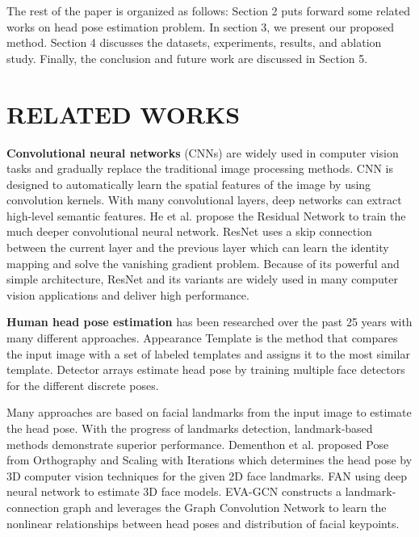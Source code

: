 \documentclass[a4paper,twoside]{article}
\begin{document}
The rest of the paper is organized as follows: Section 2 puts forward some related works on head pose estimation problem. In section 3, we present our proposed method. Section 4 discusses the datasets, experiments, results, and ablation study. Finally, the conclusion and future work are discussed in Section 5.

\section{\uppercase{Related Works}}
\textbf{Convolutional neural networks} (CNNs) are widely used in computer vision tasks and gradually replace the traditional image processing methods. CNN is designed to automatically learn the spatial features of the image by using convolution kernels. With many convolutional layers, deep networks can extract high-level semantic features. He et al. \cite{he2016deep} propose the Residual Network to train the much deeper convolutional neural network. ResNet uses a skip connection between the current layer and the previous layer which can learn the identity mapping and solve the vanishing gradient problem. Because of its powerful and simple architecture, ResNet and its variants \cite{xie2017aggregated,zhang2020resnest,gao2019res2net} are widely used in many computer vision applications and deliver high performance.

\textbf{Human head pose estimation} has been researched over the past 25 years with many different approaches. Appearance Template \cite{niyogi1996example,beymer1994face,sherrah2001face,ng2002composite,sherrah1999understanding} is the method that compares the input image with a set of labeled templates and assigns it to the most similar template. Detector arrays \cite{huang1998face,zhang2006head,jones2003fast} estimate head pose by training multiple face detectors for the different discrete poses. 

Many approaches are based on facial landmarks from the input image to estimate the head pose. With the progress of landmarks detection, landmark-based methods demonstrate superior performance. Dementhon et al. \cite{dementhon1995model} proposed Pose from Orthography and Scaling with Iterations which determines the head pose by 3D computer vision techniques for the given 2D face landmarks. FAN \cite{bulat2017far} using deep neural network to estimate 3D face models. EVA-GCN \cite{xin2021eva} constructs a landmark-connection graph and leverages the Graph Convolution Network \cite{yan2018spatial} to learn the nonlinear relationships between head poses and distribution of facial keypoints.
\end{document}
